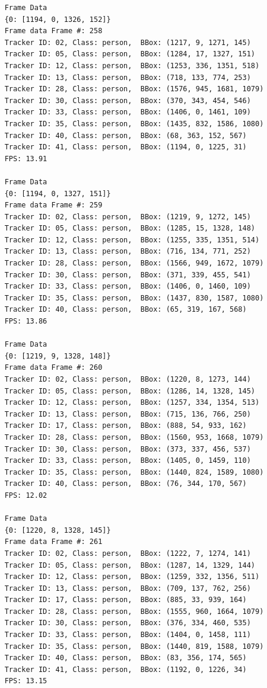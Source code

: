 \documentclass{fisatprojectfinal}
\begin{document}
\begin{verbatim}
    Frame Data
    {0: [1194, 0, 1326, 152]}
    Frame data Frame #: 258
    Tracker ID: 02, Class: person,  BBox: (1217, 9, 1271, 145)
    Tracker ID: 05, Class: person,  BBox: (1284, 17, 1327, 151)
    Tracker ID: 12, Class: person,  BBox: (1253, 336, 1351, 518)
    Tracker ID: 13, Class: person,  BBox: (718, 133, 774, 253)
    Tracker ID: 28, Class: person,  BBox: (1576, 945, 1681, 1079)
    Tracker ID: 30, Class: person,  BBox: (370, 343, 454, 546)
    Tracker ID: 33, Class: person,  BBox: (1406, 0, 1461, 109)
    Tracker ID: 35, Class: person,  BBox: (1435, 832, 1586, 1080)
    Tracker ID: 40, Class: person,  BBox: (68, 363, 152, 567)
    Tracker ID: 41, Class: person,  BBox: (1194, 0, 1225, 31)
    FPS: 13.91
    
    Frame Data
    {0: [1194, 0, 1327, 151]}
    Frame data Frame #: 259
    Tracker ID: 02, Class: person,  BBox: (1219, 9, 1272, 145)
    Tracker ID: 05, Class: person,  BBox: (1285, 15, 1328, 148)
    Tracker ID: 12, Class: person,  BBox: (1255, 335, 1351, 514)
    Tracker ID: 13, Class: person,  BBox: (716, 134, 771, 252)
    Tracker ID: 28, Class: person,  BBox: (1566, 949, 1672, 1079)
    Tracker ID: 30, Class: person,  BBox: (371, 339, 455, 541)
    Tracker ID: 33, Class: person,  BBox: (1406, 0, 1460, 109)
    Tracker ID: 35, Class: person,  BBox: (1437, 830, 1587, 1080)
    Tracker ID: 40, Class: person,  BBox: (65, 319, 167, 568)
    FPS: 13.86
    
    Frame Data
    {0: [1219, 9, 1328, 148]}
    Frame data Frame #: 260
    Tracker ID: 02, Class: person,  BBox: (1220, 8, 1273, 144)
    Tracker ID: 05, Class: person,  BBox: (1286, 14, 1328, 145)
    Tracker ID: 12, Class: person,  BBox: (1257, 334, 1354, 513)
    Tracker ID: 13, Class: person,  BBox: (715, 136, 766, 250)
    Tracker ID: 17, Class: person,  BBox: (888, 54, 933, 162)
    Tracker ID: 28, Class: person,  BBox: (1560, 953, 1668, 1079)
    Tracker ID: 30, Class: person,  BBox: (373, 337, 456, 537)
    Tracker ID: 33, Class: person,  BBox: (1405, 0, 1459, 110)
    Tracker ID: 35, Class: person,  BBox: (1440, 824, 1589, 1080)
    Tracker ID: 40, Class: person,  BBox: (76, 344, 170, 567)
    FPS: 12.02
    
    Frame Data
    {0: [1220, 8, 1328, 145]}
    Frame data Frame #: 261
    Tracker ID: 02, Class: person,  BBox: (1222, 7, 1274, 141)
    Tracker ID: 05, Class: person,  BBox: (1287, 14, 1329, 144)
    Tracker ID: 12, Class: person,  BBox: (1259, 332, 1356, 511)
    Tracker ID: 13, Class: person,  BBox: (709, 137, 762, 256)
    Tracker ID: 17, Class: person,  BBox: (885, 33, 939, 164)
    Tracker ID: 28, Class: person,  BBox: (1555, 960, 1664, 1079)
    Tracker ID: 30, Class: person,  BBox: (376, 334, 460, 535)
    Tracker ID: 33, Class: person,  BBox: (1404, 0, 1458, 111)
    Tracker ID: 35, Class: person,  BBox: (1440, 819, 1588, 1079)
    Tracker ID: 40, Class: person,  BBox: (83, 356, 174, 565)
    Tracker ID: 41, Class: person,  BBox: (1192, 0, 1226, 34)
    FPS: 13.15
    

\end{verbatim}
\end{document}

